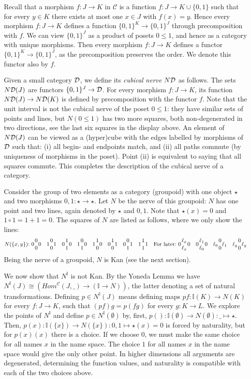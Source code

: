 \documentclass[10pt,a4paper]{article}
\newcommand{\CC}{{\mathcal C}}
\newcommand{\set}[1]{\{#1\}}
\newcommand{\interval}{\mathbb{I}}
\newcommand{\DD}{{\cal D}}
\newcommand{\ND}{N\DD}
\begin{document}
Recall that a morphism $f:J\to K$ in $\CC$ is a function $f:J\to
K\cup\set{0,1}$ such that for every $y\in K$ there exists at most one
$x\in J$ with $f(x)=y$.  Hence every morphism $f:J\to K$ defines a
function $\set{0,1}^K \to \set{0,1}^J$ through precomposition with
$f$.  We can view $\set{0,1}^J$ as a product of posets $0\leq1$, and
hence as a category with unique morphisms.  Then every morphism
$f:J\to K$ defines a functor $\set{0,1}^K \to \set{0,1}^J$, as the
precomposition preserves the order.  We denote this functor also by
$f$.

Given a small category $\DD$, we define its \emph{cubical nerve} $\ND$
as follows. The sets $\ND(J)$ are functors $\set{0,1}^J \to\DD$.  For
every morphism $f:J\to K$, its function $\ND(J)\to\ND(K)$ is defined
by precomposition with the functor $f$.  Note that the unit interval
is not the cubical nerve of the poset $0\leq1$: they have similar sets
of points and lines, but $N(0\leq1)$ has two more squares, both
non-degenerated in two directions, see the last six squares in the
display above.  An element of $\ND(J)$ can be viewed as a (hyper)cube
with the edges labelled by morphisms of $\DD$ such that: (i) all
begin- and endpoints match, and (ii) all paths commute (by uniqueness
of morphisms in the poset).  Point (ii) is equivalent to saying that
all squares commute.  This completes the description of the cubical
nerve of a category.

Consider the group of two elements as a category (groupoid) with one
object $\star$ and two morphisms $0,1:\star\to\star$.  Let $N$ be the
nerve of this groupoid: $N$ has one point and two lines, again denoted
by $\star$ and $0,1$.  Note that $\star(x) = 0$ and $1\circ 1 =
1+1=0$.  The squares of $N$ are listed as follows, where we only show
the lines:
\[
\def\ol{{1 \atop 0}}
\def\oo{{0 \atop 0}}
\def\lo{{0 \atop 1}}
\def\ll{{1 \atop 1}}
N(\set{x,y}){:}~
0\oo0 \quad 1\oo1 \quad 0\ll0 \quad 1\lo0 \quad 1\ol0 \quad 0\ol1 \quad 0\lo1 \quad 1\ll1
\quad\mbox{For later:}~0{\ell_x \atop \ell_x}0 \quad 0{\ell_1 \atop \ell_0}0
\quad \ell_0{0 \atop 0}\ell_1 \quad \ell_y{0 \atop 0}\ell_y\]
Being the nerve of a groupoid, $N$ is Kan (see the next section).

We now show that $N^\interval$ is not Kan. By the Yoneda Lemma we have
$N^\interval(J)\cong (Hom^{\CC}(J,\_)\to (\interval\to N))$, the
latter denoting a set of natural transformations.  Defining $p\in
N^\interval(J)$ means defining maps $pf:\interval(K)\to N(K)$ for
every $f:J\to K$, such that $(pf)g=p(fg)$ for every $g:K\to L$. We
explore the points of $N^\interval$ and define $p\in
N^\interval(\emptyset)$ by, first, $p():\interval(\emptyset)\to
N(\emptyset):\_\mapsto\star$.  Then, $p(x):\interval(\set{x})\to
N(\set{x}): 0,1 \mapsto\star(x)=0$ is forced by naturality, but for
$p(x)(x)$ there is a choice. If we choose $0$, we must make the same
choice for all names $x$ in the name space.  The choice $1$ for all
names $x$ in the name space would give the only other point. In higher
dimensions all arguments are degenerated, determining the function
values, and naturality is compatible with each of the two choices
above.
\end{document}

